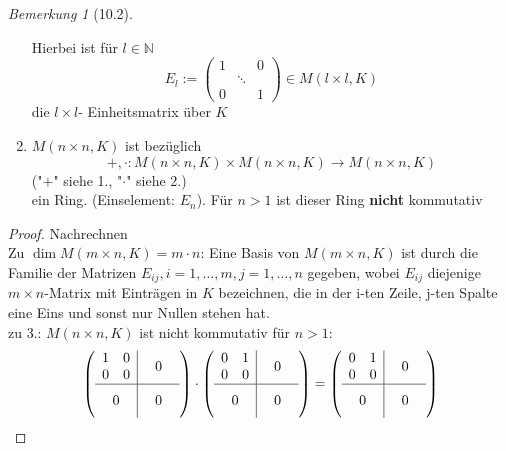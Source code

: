 \documentclass[a4paper]{scrartcl}
\theoremstyle{definition}
\theoremstyle{plain}
\theoremstyle{plain}
\theoremstyle{remark}
\newtheorem{remark}{Bemerkung}
\theoremstyle{remark}
\theoremstyle{remark}
\theoremstyle{remark}
\theoremstyle{remark}
\begin{document}
\begin{remark}[10.2]
\begin{enumerate}
\begin{itemize}
\end{itemize}
Hierbei ist für $l \in \mathbb{N}$
\[E_l := \begin{pmatrix} 1 & & 0 \\ & \ddots & \\ 0 & & 1 \end{pmatrix} \in M(l\times l, K)\]
die $l\times l$- Einheitsmatrix über $K$
\item $M(n\times n, K)$ ist bezüglich
\[+,\cdot : M(n\times n, K) \times M(n\times n, K) \to M(n\times n, K)\]
("$+$" siehe 1., "$\cdot$" siehe 2.) \\
     ein Ring. (Einselement: $E_n$). Für $n > 1$ ist dieser Ring \textbf{nicht} kommutativ
\end{enumerate}
\end{remark}
\begin{proof}
Nachrechnen \\
  Zu $\dim M(m\times n, K) = m\cdot n$: Eine Basis von $M(m\times n, K)$ ist durch die Familie der Matrizen $E_{ij}, i = 1, \ldots, m, j = 1,\ldots, n$ gegeben, wobei $E_{ij}$ diejenige $m\times n$-Matrix mit Einträgen in $K$ bezeichnen, die in der i-ten Zeile, j-ten Spalte eine Eins
und sonst nur Nullen stehen hat. \\
  zu 3.: $M(n\times n, K)$ ist nicht kommutativ für $n > 1$:
\begin{align*}
&\sbox0{$\begin{matrix} 1 & 0 \\ 0 & 0 \end{matrix}$}%
\sbox1{$\begin{matrix} 0 & 1 \\ 0 & 0 \end{matrix}$}%
\left(
\begin{array}{c|c}
\usebox{0}&\makebox[\wd0]{$0$} \\
\hline
\vphantom{\usebox{0}}\makebox[\wd0]{$0$}&\makebox[\wd0]{$0$}
\end{array}
\right)
\cdot
\left(
\begin{array}{c|c}
\usebox{1}&\makebox[\wd1]{$0$} \\
\hline
\vphantom{\usebox{1}}\makebox[\wd1]{$0$}&\makebox[\wd1]{$0$}
\end{array}
\right)
=
\left(
\begin{array}{c|c}
\usebox{1}&\makebox[\wd1]{$0$} \\
\hline
\vphantom{\usebox{1}}\makebox[\wd1]{$0$}&\makebox[\wd1]{$0$}
\end{array}
\right) \\

\end{align*}
\end{proof}
\end{document}
